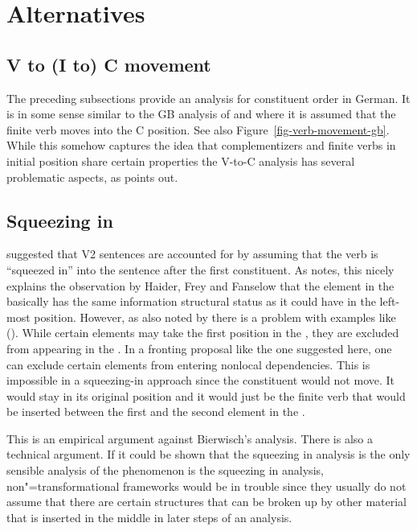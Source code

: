 \section{Alternatives}

\subsection{V to (I to) C movement}
\label{sec-v-to-c-movement}

The preceding subsections provide an analysis for constituent order in German. It is in some sense
similar to the GB analysis of \citep[Chapter~1]{Thiersch78a} and \citep{denBesten} where it is assumed that the
finite verb moves into the C position. See also Figure~\vref{fig-verb-movement-gb}. While this
somehow captures the idea that complementizers and finite verbs in initial position share certain
properties \citep{Hoehle97a} the V-to-C analysis has several problematic aspects, as
\citet{Fanselow2009a} points out.



\subsection{Squeezing in}

\citet[]{Bierwisch63a} suggested that V2 sentences are accounted for by assuming that the verb
is ``squeezed in'' into the sentence after the first constituent. As \citet{Fanselow2009a} notes,
this nicely explains the observation by Haider, Frey and Fanselow that the
element in the \vf basically has the same information structural status as it could have in the
left-most \mf position. However, as also noted by \citet{Fanselow2009b} there is a problem with
examples like (). While certain elements may take the first position in the \mf, they are
excluded from appearing in the \vf.
\eal
\ex
\zl
In a fronting proposal like the one suggested here, one can exclude certain elements from entering
nonlocal dependencies. This is impossible in a squeezing-in approach since the \mf constituent would
not move. It would stay in its original position and it would just be the finite verb that would be
inserted between the first and the second element in the \mf.

This is an empirical argument against Bierwisch's analysis. There is also a technical argument. If
it could be shown that the squeezing in analysis is the only sensible analysis of the phenomenon is
the squeezing in analysis, non"=transformational frameworks would be in trouble since they usually do
not assume that there are certain structures that can be broken up by other material that is
inserted in the middle in later steps of an analysis.

